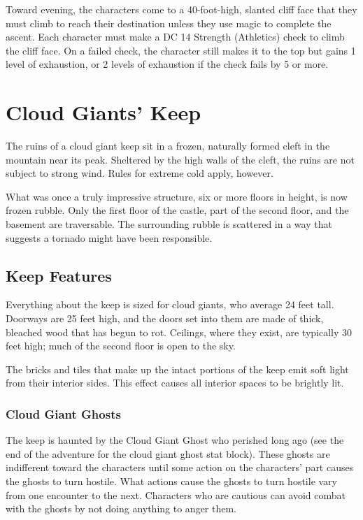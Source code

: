 \documentclass[10pt,a4paper,twoside,bg=print,twocolumn,openany,nodeprecatedcode]{dndbook}
\begin{document}
Toward evening, the characters come to a 40-foot-high, slanted cliff face that they must climb to reach their destination unless they use magic to complete the ascent. Each character must make a DC 14 Strength (Athletics) check to climb the cliff face. On a failed check, the character still makes it to the top but gains 1 level of exhaustion, or 2 levels of exhaustion if the check fails by 5 or more.

\section{Cloud Giants' Keep}
The ruins of a cloud giant keep sit in a frozen, naturally formed cleft in the mountain near its peak. Sheltered by the high walls of the cleft, the ruins are not subject to strong wind. Rules for extreme cold apply, however.

What was once a truly impressive structure, six or more floors in height, is now frozen rubble. Only the first floor of the castle, part of the second floor, and the basement are traversable. The surrounding rubble is scattered in a way that suggests a tornado might have been responsible.

\subsection{Keep Features}
Everything about the keep is sized for cloud giants, who average 24 feet tall. Doorways are 25 feet high, and the doors set into them are made of thick, bleached wood that has begun to rot. Ceilings, where they exist, are typically 30 feet high; much of the second floor is open to the sky.

The bricks and tiles that make up the intact portions of the keep emit soft light from their interior sides. This effect causes all interior spaces to be brightly lit.

\subsubsection{Cloud Giant Ghosts}
The keep is haunted by the Cloud Giant Ghost who perished long ago (see the end of the adventure for the cloud giant ghost stat block). These ghosts are indifferent toward the characters until some action on the characters' part causes the ghosts to turn hostile. What actions cause the ghosts to turn hostile vary from one encounter to the next. Characters who are cautious can avoid combat with the ghosts by not doing anything to anger them.
\end{document}
